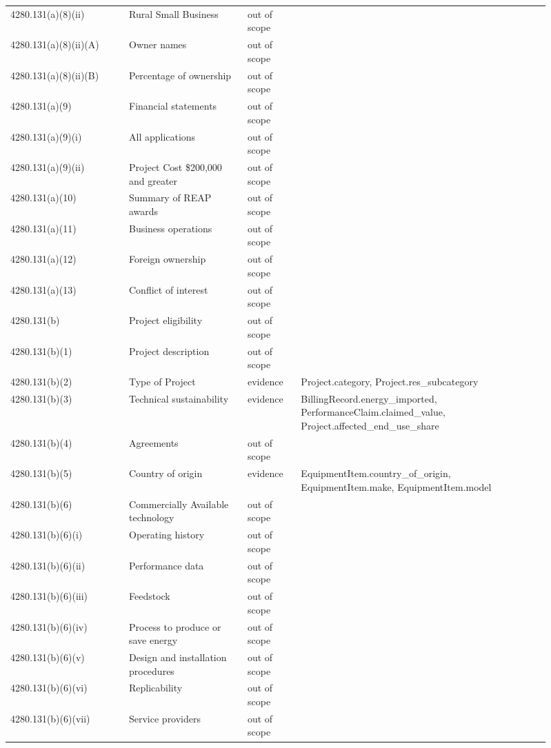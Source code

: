 \begin{longtable}{p{0.2\linewidth}p{0.2\linewidth}p{0.09\linewidth}p{0.42\linewidth}}
4280.131(a)(8)(ii) & Rural Small Business & out of scope &  \\
4280.131(a)(8)(ii)(A) & Owner names & out of scope &  \\
4280.131(a)(8)(ii)(B) & Percentage of ownership & out of scope &  \\
4280.131(a)(9) & Financial statements & out of scope &  \\
4280.131(a)(9)(i) & All applications & out of scope &  \\
4280.131(a)(9)(ii) & Project Cost \$200,000 and greater & out of scope &  \\
4280.131(a)(10) & Summary of REAP awards & out of scope &  \\
4280.131(a)(11) & Business operations & out of scope &  \\
4280.131(a)(12) & Foreign ownership & out of scope &  \\
4280.131(a)(13) & Conflict of interest & out of scope &  \\
4280.131(b) & Project eligibility & out of scope &  \\
4280.131(b)(1) & Project description & out of scope &  \\
4280.131(b)(2) & Type of Project & evidence & Project.category, Project.res\_subcategory \\
4280.131(b)(3) & Technical sustainability & evidence & BillingRecord.energy\_imported, PerformanceClaim.claimed\_value, Project.affected\_end\_use\_share \\
4280.131(b)(4) & Agreements & out of scope &  \\
4280.131(b)(5) & Country of origin & evidence & EquipmentItem.country\_of\_origin, EquipmentItem.make, EquipmentItem.model \\
4280.131(b)(6) & Commercially Available technology & out of scope &  \\
4280.131(b)(6)(i) & Operating history & out of scope &  \\
4280.131(b)(6)(ii) & Performance data & out of scope &  \\
4280.131(b)(6)(iii) & Feedstock & out of scope &  \\
4280.131(b)(6)(iv) & Process to produce or save energy & out of scope &  \\
4280.131(b)(6)(v) & Design and installation procedures & out of scope &  \\
4280.131(b)(6)(vi) & Replicability & out of scope &  \\
4280.131(b)(6)(vii) & Service providers & out of scope &  \\

\end{longtable}
